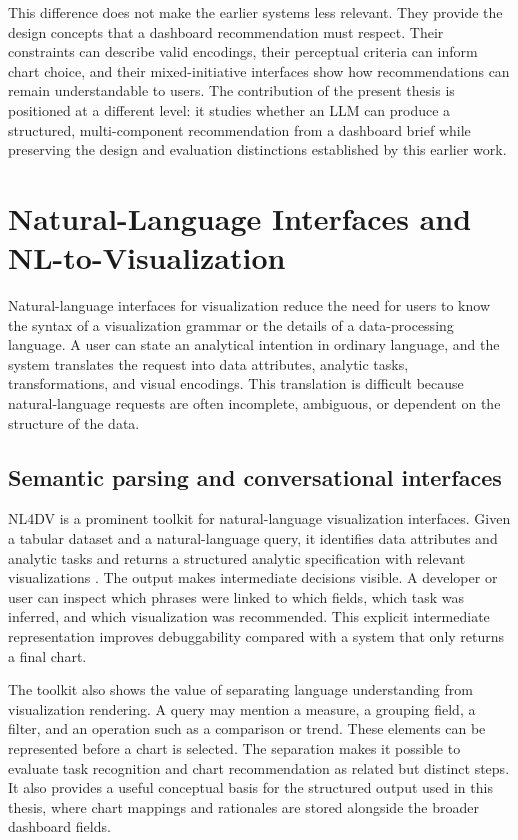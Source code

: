 This difference does not make the earlier systems less relevant. They provide the design concepts that a dashboard recommendation must respect. Their constraints can describe valid encodings, their perceptual criteria can inform chart choice, and their mixed-initiative interfaces show how recommendations can remain understandable to users. The contribution of the present thesis is positioned at a different level: it studies whether an LLM can produce a structured, multi-component recommendation from a dashboard brief while preserving the design and evaluation distinctions established by this earlier work.

\section{Natural-Language Interfaces and NL-to-Visualization}

Natural-language interfaces for visualization reduce the need for users to know the syntax of a visualization grammar or the details of a data-processing language. A user can state an analytical intention in ordinary language, and the system translates the request into data attributes, analytic tasks, transformations, and visual encodings. This translation is difficult because natural-language requests are often incomplete, ambiguous, or dependent on the structure of the data.

\subsection{Semantic parsing and conversational interfaces}

NL4DV is a prominent toolkit for natural-language visualization interfaces. Given a tabular dataset and a natural-language query, it identifies data attributes and analytic tasks and returns a structured analytic specification with relevant visualizations \cite{narechania2021nl4dv}. The output makes intermediate decisions visible. A developer or user can inspect which phrases were linked to which fields, which task was inferred, and which visualization was recommended. This explicit intermediate representation improves debuggability compared with a system that only returns a final chart.

The toolkit also shows the value of separating language understanding from visualization rendering. A query may mention a measure, a grouping field, a filter, and an operation such as a comparison or trend. These elements can be represented before a chart is selected. The separation makes it possible to evaluate task recognition and chart recommendation as related but distinct steps. It also provides a useful conceptual basis for the structured output used in this thesis, where chart mappings and rationales are stored alongside the broader dashboard fields.

